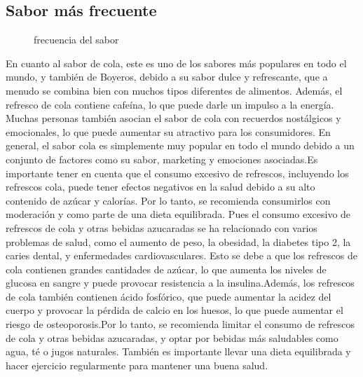 \documentclass[]{article}
\begin{document}
\subsection{Sabor más frecuente}
 \begin{figure}[h]
	\caption{frecuencia del sabor}
	\label{fig:logo}
\end{figure}
En cuanto al sabor de cola, este es uno de los sabores más populares en todo el mundo, y también de Boyeros, debido a su sabor dulce y refrescante, que a menudo se combina bien con muchos tipos diferentes de alimentos. Además, el refresco de cola contiene cafeína, lo que puede darle un impulso a la energía. Muchas personas también asocian el sabor de cola con recuerdos nostálgicos y emocionales, lo que puede aumentar su atractivo para los consumidores. En general, el sabor cola es simplemente muy popular en todo el mundo debido a un conjunto de factores como su sabor, marketing y emociones asociadas.Es importante tener en cuenta que el consumo excesivo de refrescos, incluyendo los refrescos cola, puede tener efectos negativos en la salud debido a su alto contenido de azúcar y calorías. Por lo tanto, se recomienda consumirlos con moderación y como parte de una dieta equilibrada. Pues el consumo excesivo de refrescos de cola y otras bebidas azucaradas se ha relacionado con varios problemas de salud, como el aumento de peso, la obesidad, la diabetes tipo 2, la caries dental, y enfermedades cardiovasculares. Esto se debe a que los refrescos de cola contienen grandes cantidades de azúcar, lo que aumenta los niveles de glucosa en sangre y puede provocar resistencia a la insulina.Además, los refrescos de cola también contienen ácido fosfórico, que puede aumentar la acidez del cuerpo y provocar la pérdida de calcio en los huesos, lo que puede aumentar el riesgo de osteoporosis.Por lo tanto, se recomienda limitar el consumo de refrescos de cola y otras bebidas azucaradas, y optar por bebidas más saludables como agua, té o jugos naturales. También es importante llevar una dieta equilibrada y hacer ejercicio regularmente para mantener una buena salud.
\end{document}
